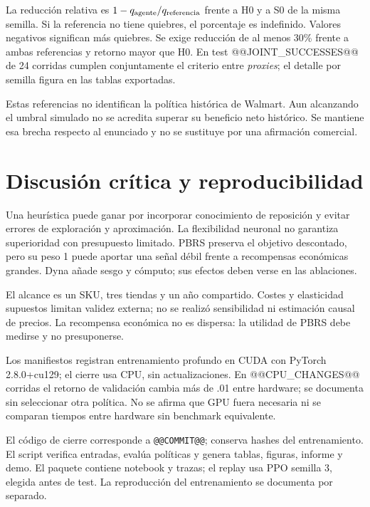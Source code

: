\documentclass[conference]{IEEEtran}
\begin{document}
La reducción relativa es $1-q_{\rm agente}/q_{\rm referencia}$ frente a H0 y a S0 de la misma semilla. Si la referencia no tiene quiebres, el porcentaje es indefinido. Valores negativos significan más quiebres. Se exige reducción de al menos 30\% frente a ambas referencias y retorno mayor que H0. En test @@JOINT_SUCCESSES@@ de 24 corridas cumplen conjuntamente el criterio entre \emph{proxies}; el detalle por semilla figura en las tablas exportadas.

Estas referencias no identifican la política histórica de Walmart. Aun alcanzando el umbral simulado no se acredita superar su beneficio neto histórico. Se mantiene esa brecha respecto al enunciado y no se sustituye por una afirmación comercial.

\section{Discusión crítica y reproducibilidad}
Una heurística puede ganar por incorporar conocimiento de reposición y evitar errores de exploración y aproximación. La flexibilidad neuronal no garantiza superioridad con presupuesto limitado. PBRS preserva el objetivo descontado, pero su peso 1 puede aportar una señal débil frente a recompensas económicas grandes. Dyna añade sesgo y cómputo; sus efectos deben verse en las ablaciones.

El alcance es un SKU, tres tiendas y un año compartido. Costes y elasticidad supuestos limitan validez externa; no se realizó sensibilidad ni estimación causal de precios. La recompensa económica no es dispersa: la utilidad de PBRS debe medirse y no presuponerse.

Los manifiestos registran entrenamiento profundo en CUDA con PyTorch 2.8.0+cu129; el cierre usa CPU, sin actualizaciones. En @@CPU_CHANGES@@ corridas el retorno de validación cambia más de .01 entre hardware; se documenta sin seleccionar otra política. No se afirma que GPU fuera necesaria ni se comparan tiempos entre hardware sin benchmark equivalente.

El código de cierre corresponde a \texttt{@@COMMIT@@}; conserva hashes del entrenamiento. El script verifica entradas, evalúa políticas y genera tablas, figuras, informe y demo. El paquete contiene notebook y trazas; el replay usa PPO semilla 3, elegida antes de test. La reproducción del entrenamiento se documenta por separado.
\end{document}
